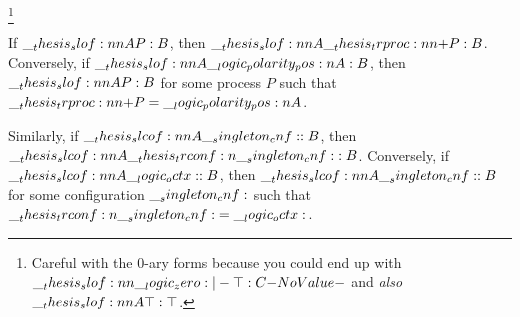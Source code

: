 \footnote{Careful with the 0-ary forms because you could end up with $\slof{\zero |- \top : C}$ and \emph{also} $\slof{A |- \top : \top}$.}

\begin{theorem}
  If $\slof{A |- P : B}$, then $\slof{A |- \trproc[+]{P} : B}$.
  Conversely, if $\slof{A |- \p{A} : B}$, then $\slof{A |- P : B}$ for some process $P$ such that $\trproc[+]{P} = \p{A}$.

  Similarly, if $\slcof{A |- \cnf : B}$, then $\slcof{A |- \trconf{\cnf} : B}$.
  Conversely, if $\slcof{A |- \octx : B}$, then $\slcof{A |- \cnf : B}$ for some configuration $\__singleton_cnf:$ such that $\__thesis_trconf:n {\__singleton_cnf:} = \__logic_octx:$.
\end{theorem}

